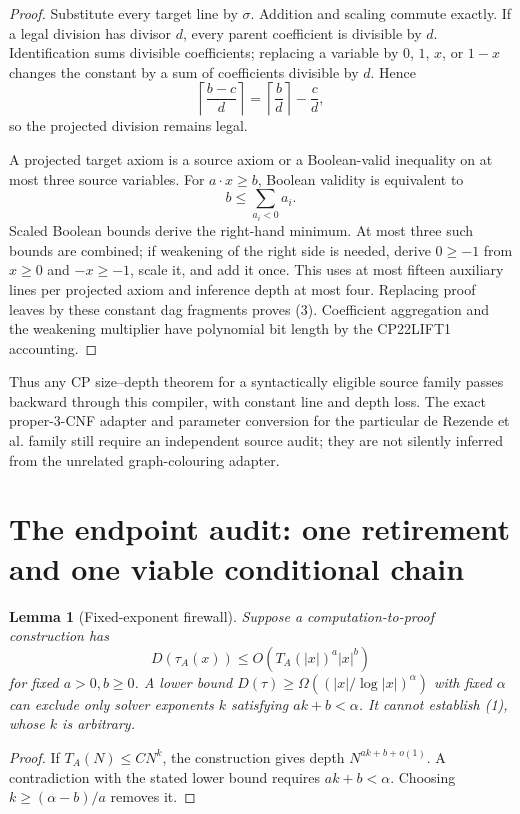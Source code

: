 \documentclass[11pt]{article}
\newtheorem{lemma}[theorem]{Lemma}
\begin{document}
\begin{proof}
Substitute every target line by $\sigma$.  Addition and scaling commute
exactly.  If a legal division has divisor $d$, every parent coefficient is
divisible by $d$.  Identification sums divisible coefficients; replacing a
variable by $0$, $1$, $x$, or $1-x$ changes the constant by a sum of
coefficients divisible by $d$.  Hence
\[
 \left\lceil\frac{b-c}{d}\right\rceil
 =\left\lceil\frac b d\right\rceil-\frac c d,                  \tag{4}
\]
so the projected division remains legal.

A projected target axiom is a source axiom or a Boolean-valid inequality on
at most three source variables.  For $a\cdot x\ge b$, Boolean validity is
equivalent to
\[
                   b\le\sum_{a_i<0}a_i.                            \tag{5}
\]
Scaled Boolean bounds derive the right-hand minimum.  At most three such
bounds are combined; if weakening of the right side is needed, derive
$0\ge-1$ from $x\ge0$ and $-x\ge-1$, scale it, and add it once.  This uses
at most fifteen auxiliary lines per projected axiom and inference depth at
most four.  Replacing proof leaves by these constant dag fragments proves
(3).  Coefficient aggregation and the weakening multiplier have polynomial
bit length by the CP22LIFT1 accounting.
\end{proof}

Thus any CP size--depth theorem for a syntactically eligible source family
passes backward through this compiler, with constant line and depth loss.
The exact proper-3-CNF adapter and parameter conversion for the particular
de Rezende et al. family still require an independent source audit; they are
not silently inferred from the unrelated graph-colouring adapter.

\section{The endpoint audit: one retirement and one viable conditional chain}

\begin{lemma}[Fixed-exponent firewall]\label{lem:firewall}
Suppose a computation-to-proof construction has
\[
 D(\tau_A(x))\le O(T_A(|x|)^a|x|^b)
\]
for fixed $a>0,b\ge0$.  A lower bound
$D(\tau)\ge\Omega((|x|/\log|x|)^\alpha)$ with fixed $\alpha$
can exclude only solver exponents $k$ satisfying $ak+b<\alpha$.
It cannot establish (1), whose $k$ is arbitrary.
\end{lemma}
\begin{proof}
If $T_A(N)\le CN^k$, the construction gives depth
$N^{ak+b+o(1)}$.  A contradiction with the stated lower bound requires
$ak+b<\alpha$.  Choosing $k\ge(\alpha-b)/a$ removes it.
\end{proof}
\end{document}
